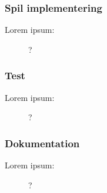 \subsubsection*{Spil implementering}
\begin{description}
	\item[Lorem ipsum:] ?
\end{description}

\subsubsection*{Test}
\begin{description}
	\item[Lorem ipsum:] ?
\end{description}

\subsubsection*{Dokumentation}
\begin{description}
	\item[Lorem ipsum:] ?
\end{description}